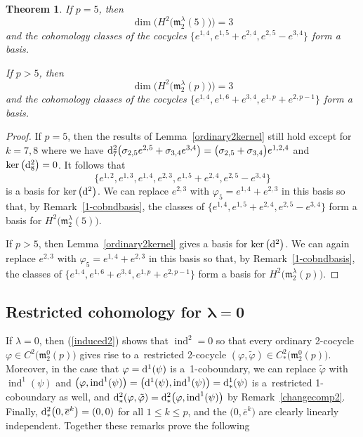 \documentclass[pdftex]{sigma}
\def\ind{\operatorname{ind}}
\def\phi{\varphi}
\def\m{\mathfrak m}
\numberwithin{equation}{section}
\newtheorem{Theorem}{Theorem}[section]
\begin{document}
\begin{Theorem}\label{ordinary2}
 If $p=5$, then
 \[\dim\big(H^2\big(\m_2^\lambda(5)\big)\big)=3\] and the
 cohomology classes of the cocycles
 $\big\{e^{1,4}, e^{1,5}+e^{2,4}, e^{2,5}-e^{3,4}\big\}$ form a basis.

 If $p>5$, then
 \[\dim\big(H^2\big(\m_2^\lambda(p)\big)\big)=3\] and the
 cohomology classes of the cocycles $\big\{e^{1,4}, e^{1,6}+e^{3,4}, e^{1,p}+e^{2,p-1}\big\}$ form a basis.
\end{Theorem}

\begin{proof} If $p=5$, then the results of Lemma~\ref{ordinary2kernel} still hold except for $k=7,8$ where we
 have
 ${\rm d}^2_7\big(\sigma_{2,5}e^{2,5}+\sigma_{3,4}e^{3,4}\big)=\big(\sigma_{2,5}+\sigma_{3,4}\big)e^{1,2,4}$
 and $\ker\big({\rm d}^2_8\big)=0$. It follows that
 \[\big\{e^{1,2}, e^{1,3}, e^{1,4}, e^{2,3},
 e^{1,5}+e^{2,4},e^{2,5}-e^{3,4}\big\}\] is a basis for $\ker
 \big({\rm d}^2\big)$. We can replace $e^{2,3}$ with $\phi_5=e^{1,4}+e^{2,3}$ in
 this basis so that, by Remark~\ref{1-cobndbasis}, the classes of
 $\big\{e^{1,4}, e^{1,5}+e^{2,4}, e^{2,5}-e^{3,4}\big\}$ form a basis for
 $H^2\big(\m_2^\lambda(5)\big)$.

 If $p > 5$, then Lemma~\ref{ordinary2kernel} gives a basis for $\ker \big({\rm d}^2\big)$. We can again replace $e^{2,3}$ with $\phi_5=e^{1,4}+e^{2,3}$ in this basis so that, by Remark~\ref{1-cobndbasis}, the classes of $\big\{e^{1,4}, e^{1,6}+e^{3,4}, e^{1,p}+e^{2,p-1}\big\}$ form a basis for
 $H^2\big(\m_2^\lambda(p)\big)$.
\end{proof}

\subsection[Restricted cohomology for $\lambda=0$]{Restricted cohomology for $\boldsymbol{\lambda=0}$}\label{section4.2}
If $\lambda=0$, then (\ref{induced2}) shows that $\ind^2=0$ so that
every ordinary 2-cocycle $\phi\in C^2\big(\m_2^0(p)\big)$ gives rise to a~restricted 2-cocycle $(\phi,\tilde \phi)\in
C^2_*\big(\m_2^0(p)\big)$. Moreover, in the case that $\phi={\rm d}^1(\psi)$ is a~1-coboundary, we can replace $\tilde\phi$ with $\ind^1(\psi)$ and
$\big(\phi,\ind^1(\psi)\big)=\big({\rm d}^1(\psi),\ind^1(\psi)\big)={\rm d}^1_*(\psi)$ is a~restricted 1-coboundary as well, and
${\rm d}^2_*(\phi,\tilde\phi)={\rm d}^2_*\big(\phi,\ind^1(\psi)\big)$ by Remark~\ref{changecomp2}. Finally, ${\rm d}^2_*\big(0,\overline e^k\big)=(0,0)$ for
all $1\le k\le p$, and the $\big(0,\overline e^k\big)$ are clearly linearly independent. Together these remarks prove the following
\end{document}
